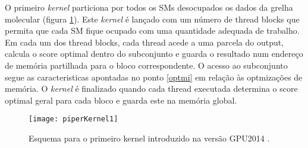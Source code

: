 O primeiro \textit{kernel} particiona por todos os SMs desocupados os dados da grelha molecular (figura \ref{k1piper}). Este \textit{kernel} é lançado com um número de thread blocks que permita que cada SM fique ocupado com uma quantidade adequada de trabalho. Em cada um dos thread blocks, cada thread acede a uma parcela do output, calcula o score optimal dentro do subconjunto e guarda o resultado num endereço de memória partilhada para o bloco correspondente. O acesso ao subconjunto segue as caracteristicas apontadas no ponto \ref{optmi} em relação às optmizações de memória.  O \textit{kernel} é finalizado quando cada thread executada determina o score optimal geral para cada bloco e guarda este na memória global. \par
\begin{figure}[ht]
  \centering
    {\texttt{[image: piperKernel1]}}
  \caption{Esquema para o primeiro kernel introduzido na versão GPU2014 \cite{piper2014gpu}. }
  \label{k1piper}
\end{figure}

